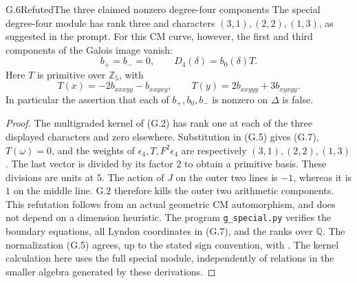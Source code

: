 \begin{statement}{G.6}{Refuted}{The three claimed nonzero degree-four components}
The special degree-four module has rank three and characters
$(3,1),(2,2),(1,3)$, as suggested in the prompt. For this CM curve,
however, the first and third components of the Galois image vanish:
\[
 b_+=b_-=0,
 \qquad D_4(\delta)=b_0(\delta)T.
 \tag{G.6}
\]
Here $T$ is primitive over $\mathbb Z_5$, with
\[
 T(x)=-2b_{xxxyy}-b_{xxyxy},\qquad
 T(y)=2b_{xxyyy}+3b_{xyxyy}.                              \tag{G.7}
\]
In particular the assertion that each of $b_+,b_0,b_-$ is nonzero on
$\Delta$ is false.
\end{statement}
\begin{proof}
The multigraded kernel of (G.2) has rank one at each of the three
displayed characters and zero elsewhere. Substitution in (G.5) gives
(G.7), $T(\omega)=0$, and the weights of $\epsilon_4,T,F^2\epsilon_4$
are respectively $(3,1),(2,2),(1,3)$. The last vector is divided by its
factor $2$ to obtain a primitive basis. These divisions are units at
$5$. The action of $J$ on the outer two lines is $-1$, whereas it is
$1$ on the middle line. G.2 therefore kills the outer two arithmetic
components. This refutation follows from an actual geometric CM
automorphism, and does not depend on a dimension heuristic.
The program \texttt{g\_special.py} verifies the boundary equations,
all Lyndon coordinates in (G.7), and the ranks over $\mathbb Q$.
The normalization (G.5) agrees, up to the stated sign convention,
with \citet[(3.1.1)]{Tsunogai1995}. The kernel calculation here
uses the full special module, independently of relations in the
smaller algebra generated by these derivations.
\end{proof}

